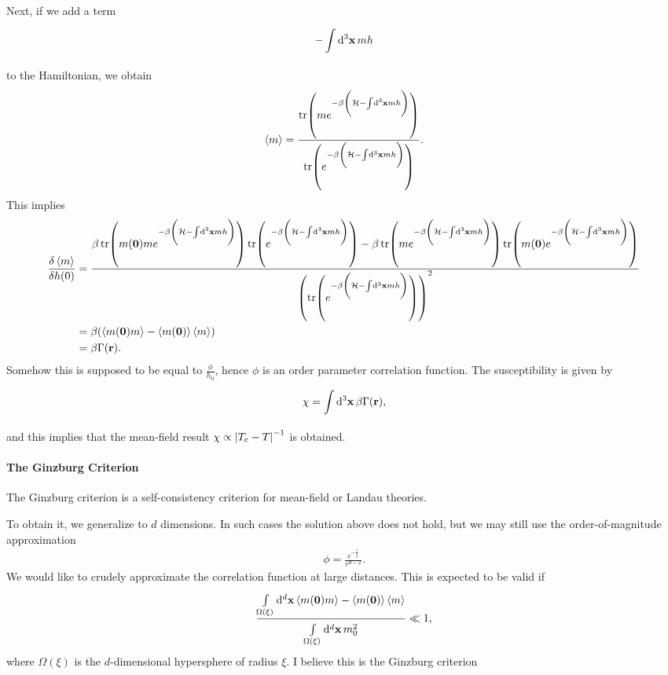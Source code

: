 Next, if we add a term
\begin{align*}
	-\integ[3]{}{}{\vb{x}}{mh}
\end{align*}
to the Hamiltonian, we obtain
\begin{align*}
	\expval{m} = \frac{\tr(me^{-\beta\left(\ham - \integ[3]{}{}{\vb{x}}{mh}\right)})}{\tr(e^{-\beta\left(\ham - \integ[3]{}{}{\vb{x}}{mh}\right)})}.
\end{align*}
This implies
\begin{align*}
	\fdv{\expval{m}}{h(0)} &= \frac{\beta \tr(m(\vb{0})me^{-\beta\left(\ham - \integ[3]{}{}{\vb{x}}{mh}\right)})\tr(e^{-\beta\left(\ham - \integ[3]{}{}{\vb{x}}{mh}\right)}) - \beta\tr(me^{-\beta\left(\ham - \integ[3]{}{}{\vb{x}}{mh}\right)})\tr(m(\vb{0})e^{-\beta\left(\ham - \integ[3]{}{}{\vb{x}}{mh}\right)})}{\left(\tr(e^{-\beta\left(\ham - \integ[3]{}{}{\vb{x}}{mh}\right)})\right)^{2}} \\
	                       &= \beta(\expval{m(\vb{0})m} - \expval{m(\vb{0})}\expval{m}) \\
	                       &= \beta\Gamma(\vb{r}).
\end{align*}
Somehow this is supposed to be equal to $\frac{\phi}{h_{0}}$, hence $\phi$ is an order parameter correlation function. The susceptibility is given by
\begin{align*}
	\chi = \integ[3]{}{}{\vb{x}}{\beta\Gamma(\vb{r})},
\end{align*}
and this implies that the mean-field result $\chi\propto\abs{T_{\text{c}} - T}^{-1}$ is obtained.

\paragraph{The Ginzburg Criterion}
The Ginzburg criterion is a self-consistency criterion for mean-field or Landau theories.

To obtain it, we generalize to $d$ dimensions. In such cases the solution above does not hold, but we may still use the order-of-magnitude approximation
\begin{align*}
	\phi = \frac{e^{-\frac{r}{\xi}}}{r^{d - 2}}.
\end{align*}
We would like to crudely approximate the correlation function at large distances. This is expected to be valid if
\begin{align*}
	\frac{\integ[d]{\Omega(\xi)}{}{\vb{x}}{\expval{m(\vb{0})m} - \expval{m(\vb{0})}\expval{m}}}{\integ[d]{\Omega(\xi)}{}{\vb{x}}{m_{0}^{2}}} \ll 1,
\end{align*}
where $\Omega(\xi)$ is the $d$-dimensional hypersphere of radius $\xi$. I believe this is the Ginzburg criterion

